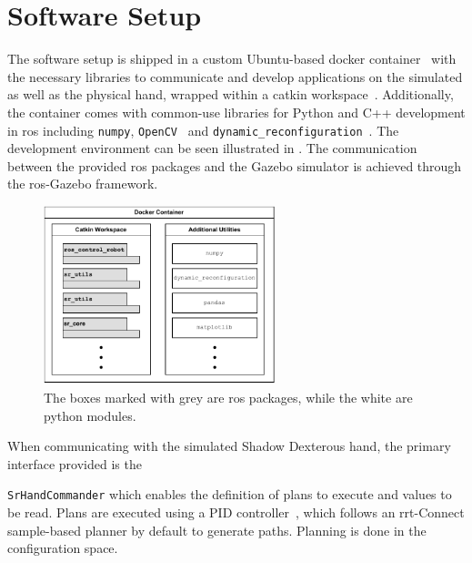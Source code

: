 \section{Software Setup} \label{sec:system-setup-software-setup}

The software setup is shipped in a custom Ubuntu-based docker container~\cite{docker, ubuntu-docker-image} with the necessary libraries to communicate and develop applications on the simulated as well as the physical hand, wrapped within a catkin workspace~\cite{catkin}. Additionally, the container comes with common-use libraries for Python and C++ development in \gls{ros} including \texttt{numpy}\cite{numpy}, \texttt{OpenCV}~\cite{opencv} and \texttt{dynamic\_reconfiguration}~\cite{dynamic-reconfiguration}. The development environment can be seen illustrated in . The communication between the provided \gls{ros} packages and the Gazebo simulator is achieved through the \gls{ros}-Gazebo framework. 

\begin{figure}[h]
	\begin{small}
		\begin{center}
			\includegraphics[width=0.6\textwidth]{chapters/system-setup/fig/init-package-diagram.pdf}
		\end{center}
		\caption{The boxes marked with grey are \gls{ros} packages, while the white are python modules.}
		\label{fig:package-diagram}
	\end{small}
\end{figure}

When communicating with the simulated Shadow Dexterous hand, the primary interface provided is the 

\texttt{SrHandCommander} which enables the definition of plans to execute and values to be read.
Plans are executed using a PID controller~\cite{controlling-the-hand}, which follows an \gls{rrt}-Connect sample-based planner by default to generate paths. Planning is done in the configuration space.

